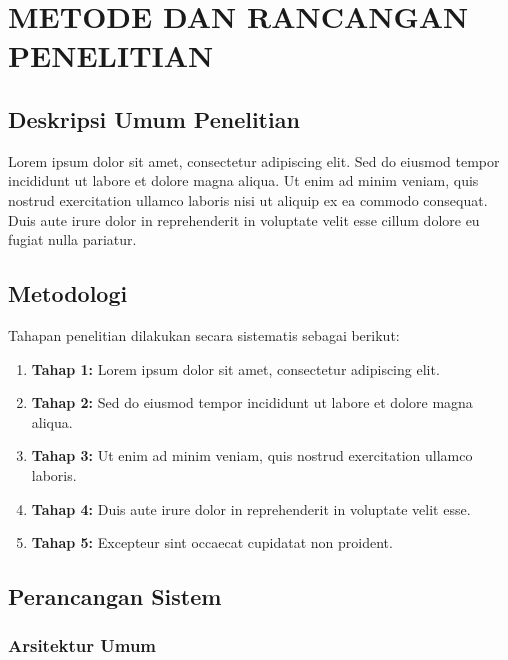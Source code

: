 \chapter{METODE DAN RANCANGAN PENELITIAN}

\section{Deskripsi Umum Penelitian}


Lorem ipsum dolor sit amet, consectetur adipiscing elit. Sed do eiusmod tempor incididunt ut labore et dolore magna aliqua. Ut enim ad minim veniam, quis nostrud exercitation ullamco laboris nisi ut aliquip ex ea commodo consequat. Duis aute irure dolor in reprehenderit in voluptate velit esse cillum dolore eu fugiat nulla pariatur.

\section{Metodologi}


Tahapan penelitian dilakukan secara sistematis sebagai berikut:

\begin{enumerate}
    \item \textbf{Tahap 1:} Lorem ipsum dolor sit amet, consectetur adipiscing elit.
    \item \textbf{Tahap 2:} Sed do eiusmod tempor incididunt ut labore et dolore magna aliqua.
    \item \textbf{Tahap 3:} Ut enim ad minim veniam, quis nostrud exercitation ullamco laboris.
    \item \textbf{Tahap 4:} Duis aute irure dolor in reprehenderit in voluptate velit esse.
    \item \textbf{Tahap 5:} Excepteur sint occaecat cupidatat non proident.
\end{enumerate}

\section{Perancangan Sistem}

\subsection{Arsitektur Umum}

